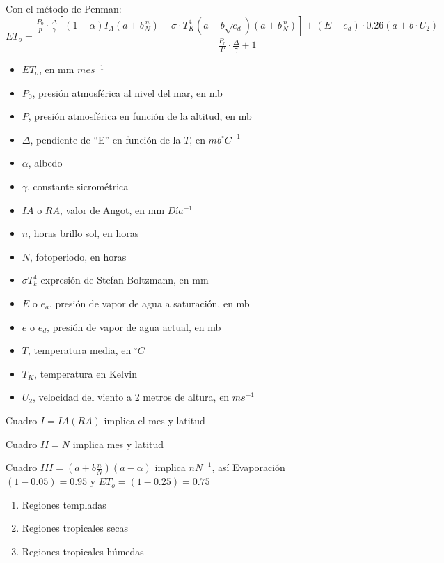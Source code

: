         
        Con el método de Penman:
        \begin{equation}
            ET_o =\frac{\frac{P_0}{p} \cdot \frac{\Delta}{\gamma}\left[\left(1 -\alpha\right)I_A\left(a + b\frac{n}{N}\right) -\sigma \cdot T_K^4\left(a - b \sqrt{e_d}\right) \left(a + b\frac{n}{N}\right) \right] + (E - e_d) \cdot  0.26\left(a + b \cdot U_2\right) }{\frac{P_0}{P}\cdot \frac{\Delta}{\gamma} + 1}
        \end{equation}
        \begin{notation}
            \begin{itemize}
                \item $ET_o$, en mm $mes^{-1}$
                \item $P_0$, presión atmosférica al nivel del mar, en mb
                \item $P$, presión atmosférica en función de la altitud, en mb
                \item $\Delta$, pendiente de “E” en función de la $T$, en $mb ^{\circ}C^{-1}$
                \item $\alpha$, albedo
                \item $\gamma$, constante sicrométrica
                \item $IA$ o $RA$, valor de Angot, en mm $Día^{-1}$
                \item $n$, horas brillo sol, en horas
                \item $N$, fotoperiodo, en horas
                \item $\sigma T^4_k$ expresión de Stefan-Boltzmann, en mm 
                \item $E$ o $e_a$, presión de vapor de agua a saturación, en mb
                \item $e$ o $e_d$, presión de vapor de agua actual, en mb
                \item $T$, temperatura media, en $^{\circ}C$
                \item $T_K$, temperatura en Kelvin
                \item $U_2$, velocidad del viento a 2 metros de altura, en $ms^{-1}$\end{itemize}
        \end{notation}
        Cuadro $I=IA (RA)$ implica el mes y latitud
        
        Cuadro $II=N$ implica mes y latitud
        
        Cuadro $III=\left(a+b\frac{n}{N}\right)\left(a-\alpha\right)$ implica $nN^{-1}$, así Evaporación $(1-0.05)= 0.95$ y $ET_o=(1-0.25)=0.75$
        \begin{enumerate}
            \item Regiones templadas
            \item Regiones tropicales secas
            \item Regiones tropicales húmedas
        \end{enumerate}
        
